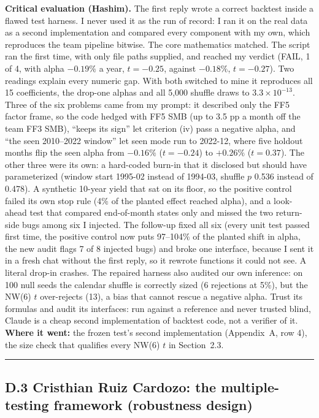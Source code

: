 \textbf{Critical evaluation (Hashim).} The first reply wrote a correct backtest inside a flawed test harness. I never used it as the run of record: I ran it on the real data as a second implementation and compared every component with my own, which reproduces the team pipeline bitwise. The core mathematics matched. The script ran the first time, with only file paths supplied, and reached my verdict (FAIL, 1 of 4, with alpha $-0.19\%$ a year, $t=-0.25$, against $-0.18\%$, $t=-0.27$). Two readings explain every numeric gap. With both switched to mine it reproduces all 15 coefficients, the drop-one alphas and all 5,000 shuffle draws to $3.3\times10^{-13}$. Three of the six problems came from my prompt: it described only the FF5 factor frame, so the code hedged with FF5 SMB (up to 3.5 pp a month off the team FF3 SMB), ``keeps its sign'' let criterion (iv) pass a negative alpha, and ``the seen 2010--2022 window'' let seen mode run to 2022-12, where five holdout months flip the seen alpha from $-0.16\%$ ($t=-0.24$) to $+0.26\%$ ($t=0.37$). The other three were its own: a hard-coded burn-in that it disclosed but should have parameterized (window start 1995-02 instead of 1994-03, shuffle $p$ 0.536 instead of 0.478). A synthetic 10-year yield that sat on its floor, so the positive control failed its own stop rule (4\% of the planted effect reached alpha), and a look-ahead test that compared end-of-month states only and missed the two return-side bugs among six I injected. The follow-up fixed all six (every unit test passed first time, the positive control now puts 97--104\% of the planted shift in alpha, the new audit flags 7 of 8 injected bugs) and broke one interface, because I sent it in a fresh chat without the first reply, so it rewrote functions it could not see. A literal drop-in crashes. The repaired harness also audited our own inference: on 100 null seeds the calendar shuffle is correctly sized (6 rejections at 5\%), but the NW(6) $t$ over-rejects (13), a bias that cannot rescue a negative alpha. Trust its formulas and audit its interfaces: run against a reference and never trusted blind, Claude is a cheap second implementation of backtest code, not a verifier of it. \textbf{Where it went:} the frozen test's second implementation (Appendix~A, row 4), the size check that qualifies every NW(6) $t$ in Section~2.3.

\begin{center}\rule{0.5\linewidth}{0.5pt}\end{center}

\subsection*{D.3 Cristhian Ruiz Cardozo: the multiple-testing framework (robustness design)}

